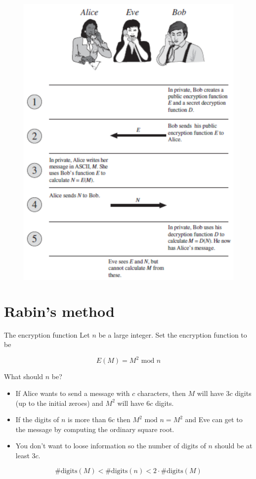 \documentclass{beamer}
\def\bl[#1]#2{\begin{block}{#1}#2\end{block}}
\def\itemb{\begin{itemize}}
\def\iteme{\end{itemize}}
\begin{document}
\begin{frame}
\begin{figure}
\centering
\includegraphics[scale=0.45]{ABE.pdf}
\end{figure}
\end{frame}


\section{Rabin's method}

\begin{frame}{The encryption function}
Let $n$ be a large integer. Set the encryption function to be
\bl[]{\[
E(M)=M^2\textrm{ mod }n
\]}
What should $n$ be?
\itemb
\item If Alice wants to send a message with $c$ characters, then $M$ will have $3c$ digits (up to the initial zeroes) and $M^2$ will have $6c$ digits.
\item If the digits of $n$ is more than $6c$ then $M^2\textrm{ mod }n=M^2$ and Eve can get to the message by computing the ordinary square root.
\item You don't want to loose information so the number of digits of $n$ should be at least $3c$. \vspace{0.2cm}
\iteme
\bl[]{\[
\#\textrm{digits}(M)<\#\textrm{digits}(n)<2\cdot\#\textrm{digits}(M)
\]}
\end{frame}
\end{document}

